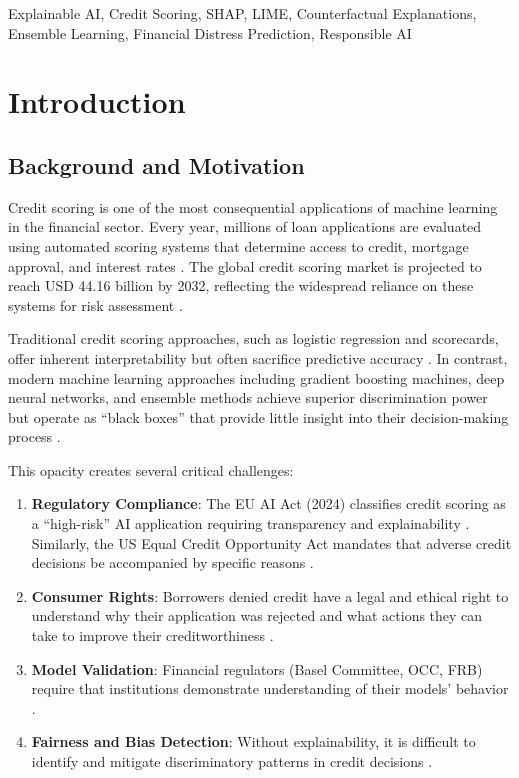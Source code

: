 \documentclass[journal]{IEEEtran}
\begin{document}
\begin{IEEEkeywords}
Explainable AI, Credit Scoring, SHAP, LIME, Counterfactual Explanations, Ensemble Learning, Financial Distress Prediction, Responsible AI
\end{IEEEkeywords}

\section{Introduction}

\subsection{Background and Motivation}

Credit scoring is one of the most consequential applications of machine learning in the financial sector. Every year, millions of loan applications are evaluated using automated scoring systems that determine access to credit, mortgage approval, and interest rates \cite{thomas2017}. The global credit scoring market is projected to reach USD 44.16 billion by 2032, reflecting the widespread reliance on these systems for risk assessment \cite{amr2023}.

Traditional credit scoring approaches, such as logistic regression and scorecards, offer inherent interpretability but often sacrifice predictive accuracy \cite{baesens2003}. In contrast, modern machine learning approaches including gradient boosting machines, deep neural networks, and ensemble methods achieve superior discrimination power but operate as ``black boxes'' that provide little insight into their decision-making process \cite{adadi2018, gunning2019}.

This opacity creates several critical challenges:

\begin{enumerate}
\item \textbf{Regulatory Compliance}: The EU AI Act (2024) classifies credit scoring as a ``high-risk'' AI application requiring transparency and explainability \cite{euaiact2024}. Similarly, the US Equal Credit Opportunity Act mandates that adverse credit decisions be accompanied by specific reasons \cite{ecoa2021}.

\item \textbf{Consumer Rights}: Borrowers denied credit have a legal and ethical right to understand why their application was rejected and what actions they can take to improve their creditworthiness \cite{wachter2021}.

\item \textbf{Model Validation}: Financial regulators (Basel Committee, OCC, FRB) require that institutions demonstrate understanding of their models' behavior \cite{basel2021}.

\item \textbf{Fairness and Bias Detection}: Without explainability, it is difficult to identify and mitigate discriminatory patterns in credit decisions \cite{hurley2016}.
\end{enumerate}
\end{document}
